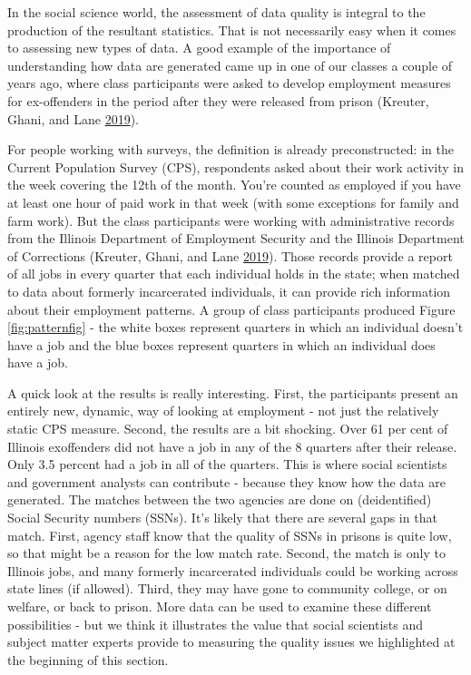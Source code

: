 \documentclass[]{krantz}
\begin{document}
In the social science world, the assessment of data quality is integral
to the production of the resultant statistics. That is not necessarily
easy when it comes to assessing new types of data. A good example of the
importance of understanding how data are generated came up in one of our
classes a couple of years ago, where class participants were asked to
develop employment measures for ex-offenders in the period after they
were released from prison (Kreuter, Ghani, and Lane
\protect\hyperlink{ref-Kreuter2019Change}{2019}).

For people working with surveys, the definition is already
preconstructed: in the Current Population Survey (CPS), respondents
asked about their work activity in the week covering the 12th of the
month. You're counted as employed if you have at least one hour of paid
work in that week (with some exceptions for family and farm work). But
the class participants were working with administrative records from the
Illinois Department of Employment Security and the Illinois Department
of Corrections (Kreuter, Ghani, and Lane
\protect\hyperlink{ref-Kreuter2019Change}{2019}). Those records provide
a report of all jobs in every quarter that each individual holds in the
state; when matched to data about formerly incarcerated individuals, it
can provide rich information about their employment patterns. A group of
class participants produced Figure \ref{fig:patternfig} - the white
boxes represent quarters in which an individual doesn't have a job and
the blue boxes represent quarters in which an individual does have a
job.

A quick look at the results is really interesting. First, the
participants present an entirely new, dynamic, way of looking at
employment - not just the relatively static CPS measure. Second, the
results are a bit shocking. Over 61 per cent of Illinois exoffenders did
not have a job in any of the 8 quarters after their release. Only 3.5
percent had a job in all of the quarters. This is where social
scientists and government analysts can contribute - because they know
how the data are generated. The matches between the two agencies are
done on (deidentified) Social Security numbers (SSNs). It's likely that
there are several gaps in that match. First, agency staff know that the
quality of SSNs in prisons is quite low, so that might be a reason for
the low match rate. Second, the match is only to Illinois jobs, and many
formerly incarcerated individuals could be working across state lines
(if allowed). Third, they may have gone to community college, or on
welfare, or back to prison. More data can be used to examine these
different possibilities - but we think it illustrates the value that
social scientists and subject matter experts provide to measuring the
quality issues we highlighted at the beginning of this section.
\end{document}

